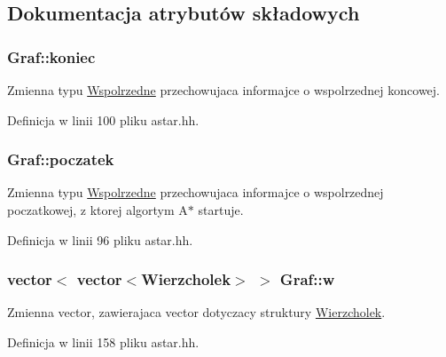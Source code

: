 \subsection{\-Dokumentacja atrybutów składowych}
\hypertarget{class_graf_accfdd27fd52eb481438f3368d63a756a}{
\subsubsection[{koniec}]{ {\bf \-Graf\-::koniec}}}\label{class_graf_accfdd27fd52eb481438f3368d63a756a}


\-Zmienna typu \hyperlink{struct_wspolrzedne}{\-Wspolrzedne} przechowujaca informajce o wspolrzednej koncowej. 



\-Definicja w linii 100 pliku astar.\-hh.

\hypertarget{class_graf_acd2b15a19a211c56df5f401ef6e940ca}{
\subsubsection[{poczatek}]{ {\bf \-Graf\-::poczatek}}}\label{class_graf_acd2b15a19a211c56df5f401ef6e940ca}


\-Zmienna typu \hyperlink{struct_wspolrzedne}{\-Wspolrzedne} przechowujaca informajce o wspolrzednej poczatkowej, z ktorej algortym \-A$\ast$ startuje. 



\-Definicja w linii 96 pliku astar.\-hh.

\hypertarget{class_graf_a735e94e0248b6cc21ff6766369f23d7f}{
\subsubsection[{w}]{\setlength{\rightskip}{0pt plus 5cm}vector$<$ vector$<${\bf \-Wierzcholek}$>$ $>$ {\bf \-Graf\-::w}}}\label{class_graf_a735e94e0248b6cc21ff6766369f23d7f}


\-Zmienna vector, zawierajaca vector dotyczacy struktury \hyperlink{struct_wierzcholek}{\-Wierzcholek}. 



\-Definicja w linii 158 pliku astar.\-hh.

